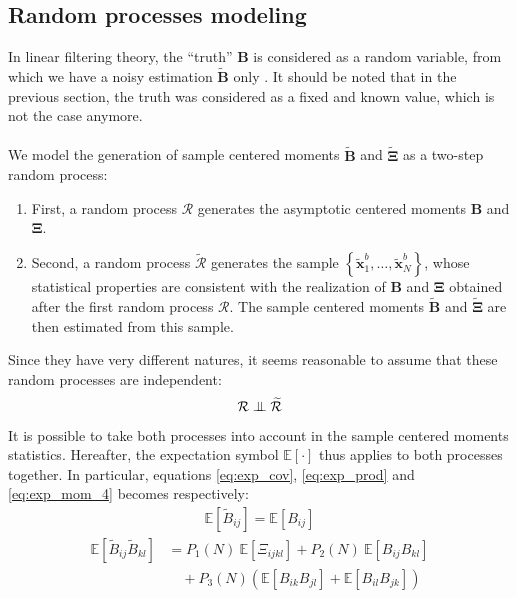 \documentclass[12pt]{scrartcl}
\newcommand\independent{\protect\mathpalette{\protect\independenT}{\perp}}
\def\independenT#1#2{\mathrel{\setbox0\hbox{$#1#2$}%
\copy0\kern-\wd0\mkern4mu\box0}}
\begin{document}
\subsection{Random processes modeling}
In linear filtering theory, the ``truth'' $\mathbf{B}$ is considered as a random variable, from which we have a noisy estimation $\widetilde{\mathbf{B}}$ only \citep{wiener_1949}. It should be noted that in the previous section, the truth was considered as a fixed and known value, which is not the case anymore.\\
$  $\\
We model the generation of sample centered moments $\widetilde{\mathbf{B}}$ and $\widetilde{\boldsymbol{\Xi}}$ as a two-step random process:
\begin{enumerate}
\item First, a random process $\mathcal{R}$ generates the asymptotic centered moments $\mathbf{B}$ and $\boldsymbol{\Xi}$.
\item Second, a random process $\widetilde{\mathcal{R}}$ generates the sample $\left\{\widetilde{\mathbf{x}}^b_1,\dots,\widetilde{\mathbf{x}}^b_N\right\}$, whose statistical properties are consistent with the realization of $\mathbf{B}$ and $\boldsymbol{\Xi}$ obtained after the first random process $\mathcal{R}$. The sample centered moments $\widetilde{\mathbf{B}}$ and $\widetilde{\boldsymbol{\Xi}}$ are then estimated from this sample.
\end{enumerate}
Since they have very different natures, it seems reasonable to assume that these random processes are independent:
\begin{align}
\label{eq:inde_process}
\mathcal{R} \independent \widetilde{\mathcal{R}}
\end{align}
It is possible to take both processes into account in the sample centered moments statistics. Hereafter, the expectation symbol $\mathbb{E}\left[\cdot\right]$ thus applies to both processes together. In particular, equations \eqref{eq:exp_cov}, \eqref{eq:exp_prod} and \eqref{eq:exp_mom_4} becomes respectively:
\begin{align}
\label{eq:exp_cov_exp}
\mathbb{E} \left[\widetilde{B}_{ij}\right] = \mathbb{E} \left[B_{ij}\right]
\end{align}
\begin{align}
\label{eq:exp_prod_exp}
\mathbb{E} \left[\widetilde{B}_{ij} \widetilde{B}_{kl}\right] & = P_1(N) \ \mathbb{E} \left[\Xi_{ijkl}\right] + P_2(N) \ \mathbb{E} \left[B_{ij} B_{kl}\right] \nonumber \\
& \quad + P_3(N) \left(\mathbb{E} \left[B_{ik} B_{jl}\right] + \mathbb{E} \left[B_{il} B_{jk}\right]\right)
\end{align}
\end{document}

